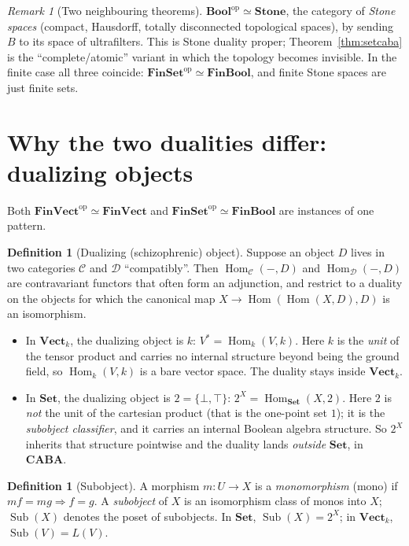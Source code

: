 \documentclass[11pt,a4paper]{article}
\theoremstyle{definition}
\newtheorem{definition}[theorem]{Definition}
\theoremstyle{remark}
\newtheorem{remark}[theorem]{Remark}
\newcommand{\dual}[1]{#1^{*}}
\newcommand{\cat}[1]{\mathbf{#1}}
\newcommand{\Set}{\cat{Set}}
\newcommand{\FinSet}{\cat{FinSet}}
\newcommand{\Bool}{\cat{Bool}}
\newcommand{\FinBool}{\cat{FinBool}}
\newcommand{\CABA}{\cat{CABA}}
\newcommand{\Vect}{\cat{Vect}}
\newcommand{\FinVect}{\cat{FinVect}}
\newcommand{\Stone}{\cat{Stone}}
\newcommand{\op}{\mathrm{op}}
\DeclareMathOperator{\Hom}{Hom}
\DeclareMathOperator{\Sub}{Sub}
\begin{document}
\begin{remark}[Two neighbouring theorems]
$\Bool^{\op} \simeq \Stone$, the category of \emph{Stone spaces} (compact, Hausdorff, totally
disconnected topological spaces), by sending $B$ to its space of ultrafilters. This is Stone
duality proper; Theorem~\ref{thm:setcaba} is the ``complete/atomic'' variant in which the
topology becomes invisible. In the finite case all three coincide:
$\FinSet^{\op} \simeq \FinBool$, and finite Stone spaces are just finite sets.
\end{remark}

\section{Why the two dualities differ: dualizing objects}

Both $\FinVect^{\op} \simeq \FinVect$ and $\FinSet^{\op} \simeq \FinBool$ are instances of one
pattern.

\begin{definition}[Dualizing (schizophrenic) object]
Suppose an object $D$ lives in two categories $\mathcal{C}$ and $\mathcal{D}$ ``compatibly''.
Then $\Hom_{\mathcal{C}}(-, D)$ and $\Hom_{\mathcal{D}}(-, D)$ are contravariant functors that
often form an adjunction, and restrict to a duality on the objects for which the canonical map
$X \to \Hom(\Hom(X,D),D)$ is an isomorphism.
\end{definition}

\begin{itemize}
  \item In $\Vect_k$, the dualizing object is $k$: $\dual{V} = \Hom_k(V,k)$. Here $k$ is the
        \emph{unit} of the tensor product and carries no internal structure beyond being the
        ground field, so $\Hom_k(V,k)$ is a bare vector space. The duality stays inside
        $\Vect_k$.
  \item In $\Set$, the dualizing object is $2 = \{\bot,\top\}$: $2^{X} = \Hom_{\Set}(X, 2)$.
        Here $2$ is \emph{not} the unit of the cartesian product (that is the one-point set
        $1$); it is the \emph{subobject classifier}, and it carries an internal Boolean
        algebra structure. So $2^{X}$ inherits that structure pointwise and the duality lands
        \emph{outside} $\Set$, in $\CABA$.
\end{itemize}

\begin{definition}[Subobject]
A morphism $m : U \to X$ is a \emph{monomorphism} (mono) if $mf = mg \Rightarrow f = g$. A
\emph{subobject} of $X$ is an isomorphism class of monos into $X$; $\Sub(X)$ denotes the poset
of subobjects. In $\Set$, $\Sub(X) = 2^{X}$; in $\Vect_k$, $\Sub(V) = L(V)$.
\end{definition}
\end{document}

